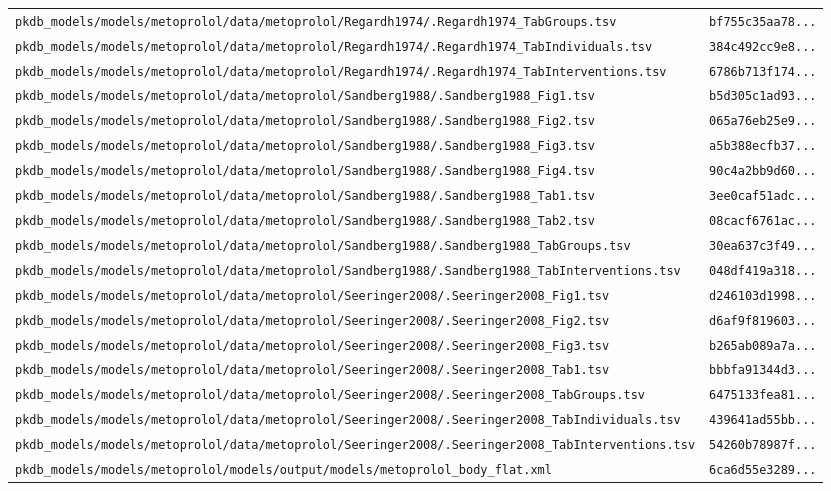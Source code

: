 \begin{longtable}{ll}
\texttt{pkdb\_models/models/metoprolol/data/metoprolol/Regardh1974/.Regardh1974\_TabGroups.tsv} & \texttt{bf755c35aa78...} \\
\texttt{pkdb\_models/models/metoprolol/data/metoprolol/Regardh1974/.Regardh1974\_TabIndividuals.tsv} & \texttt{384c492cc9e8...} \\
\texttt{pkdb\_models/models/metoprolol/data/metoprolol/Regardh1974/.Regardh1974\_TabInterventions.tsv} & \texttt{6786b713f174...} \\
\texttt{pkdb\_models/models/metoprolol/data/metoprolol/Sandberg1988/.Sandberg1988\_Fig1.tsv} & \texttt{b5d305c1ad93...} \\
\texttt{pkdb\_models/models/metoprolol/data/metoprolol/Sandberg1988/.Sandberg1988\_Fig2.tsv} & \texttt{065a76eb25e9...} \\
\texttt{pkdb\_models/models/metoprolol/data/metoprolol/Sandberg1988/.Sandberg1988\_Fig3.tsv} & \texttt{a5b388ecfb37...} \\
\texttt{pkdb\_models/models/metoprolol/data/metoprolol/Sandberg1988/.Sandberg1988\_Fig4.tsv} & \texttt{90c4a2bb9d60...} \\
\texttt{pkdb\_models/models/metoprolol/data/metoprolol/Sandberg1988/.Sandberg1988\_Tab1.tsv} & \texttt{3ee0caf51adc...} \\
\texttt{pkdb\_models/models/metoprolol/data/metoprolol/Sandberg1988/.Sandberg1988\_Tab2.tsv} & \texttt{08cacf6761ac...} \\
\texttt{pkdb\_models/models/metoprolol/data/metoprolol/Sandberg1988/.Sandberg1988\_TabGroups.tsv} & \texttt{30ea637c3f49...} \\
\texttt{pkdb\_models/models/metoprolol/data/metoprolol/Sandberg1988/.Sandberg1988\_TabInterventions.tsv} & \texttt{048df419a318...} \\
\texttt{pkdb\_models/models/metoprolol/data/metoprolol/Seeringer2008/.Seeringer2008\_Fig1.tsv} & \texttt{d246103d1998...} \\
\texttt{pkdb\_models/models/metoprolol/data/metoprolol/Seeringer2008/.Seeringer2008\_Fig2.tsv} & \texttt{d6af9f819603...} \\
\texttt{pkdb\_models/models/metoprolol/data/metoprolol/Seeringer2008/.Seeringer2008\_Fig3.tsv} & \texttt{b265ab089a7a...} \\
\texttt{pkdb\_models/models/metoprolol/data/metoprolol/Seeringer2008/.Seeringer2008\_Tab1.tsv} & \texttt{bbbfa91344d3...} \\
\texttt{pkdb\_models/models/metoprolol/data/metoprolol/Seeringer2008/.Seeringer2008\_TabGroups.tsv} & \texttt{6475133fea81...} \\
\texttt{pkdb\_models/models/metoprolol/data/metoprolol/Seeringer2008/.Seeringer2008\_TabIndividuals.tsv} & \texttt{439641ad55bb...} \\
\texttt{pkdb\_models/models/metoprolol/data/metoprolol/Seeringer2008/.Seeringer2008\_TabInterventions.tsv} & \texttt{54260b78987f...} \\
\texttt{pkdb\_models/models/metoprolol/models/output/models/metoprolol\_body\_flat.xml} & \texttt{6ca6d55e3289...} \\
\end{longtable}

